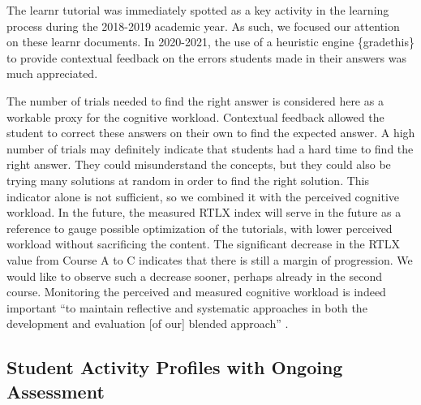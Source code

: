 \documentclass{aims}
\theoremstyle{definition}
\begin{document}
The learnr tutorial was immediately spotted as a key activity in the
learning process during the 2018-2019 academic year. As such, we focused
our attention on these learnr documents. In 2020-2021, the use of a
heuristic engine \{gradethis\} to provide contextual feedback on the
errors students made in their answers was much appreciated.

The number of trials needed to find the right answer is considered here
as a workable proxy for the cognitive workload. Contextual feedback
allowed the student to correct these answers on their own to find the
expected answer. A high number of trials may definitely indicate that
students had a hard time to find the right answer. They could
misunderstand the concepts, but they could also be trying many solutions
at random in order to find the right solution. This indicator alone is
not sufficient, so we combined it with the perceived cognitive workload.
In the future, the measured RTLX index will serve in the future as a
reference to gauge possible optimization of the tutorials, with lower
perceived workload without sacrificing the content. The significant
decrease in the RTLX value from Course A to C indicates that there is
still a margin of progression. We would like to observe such a decrease
sooner, perhaps already in the second course. Monitoring the perceived
and measured cognitive workload is indeed important ``to maintain
reflective and systematic approaches in both the development and
evaluation {[}of our{]} blended approach'' \cite{Spadafora2018}.

\hypertarget{student-activity-profiles-with-ongoing-assessment-1}{%
\subsection{Student Activity Profiles with Ongoing
Assessment}\label{student-activity-profiles-with-ongoing-assessment-1}}
\end{document}
